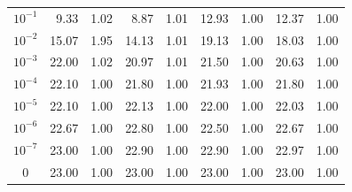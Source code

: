 \documentclass[letterpaper]{article}
\begin{document}
\begin{table}[t]
\begin{tabular}{| c | r  r | r  r | r  r | r  r |}
$10^{-1}$        & 9.33  & 1.02  & 8.87  & 1.01  & 12.93        & 1.00         & 12.37        & 1.00        \\
$10^{-2}$        & 15.07         & 1.95  & 14.13         & 1.01  & 19.13        & 1.00         & 18.03        & 1.00        \\
$10^{-3}$        & 22.00         & 1.02  & 20.97         & 1.01  & 21.50         & 1.00  & 20.63         & 1.00 \\
$10^{-4}$        & 22.10         & 1.00  & 21.80         & 1.00  & 21.93         & 1.00  & 21.80         & 1.00 \\
$10^{-5}$        & 22.10         & 1.00  & 22.13        & 1.00         & 22.00         & 1.00  & 22.03         & 1.00 \\
$10^{-6}$	 & 22.67	 & 1.00	 & 22.80	 & 1.00	 & 22.50	 & 1.00	 & 22.67	 & 1.00	\\
$10^{-7}$	 & 23.00	 & 1.00	 & 22.90	 & 1.00	 & 22.90	 & 1.00	 & 22.97	 & 1.00	\\
0        & 23.00         & 1.00          & 23.00        & 1.00         & 23.00        & 1.00         & 23.00        & 1.00        \\
\hline

\end{tabular}
\end{table}
\end{document}
